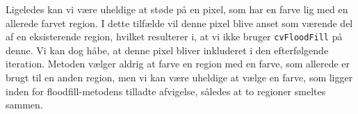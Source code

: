 {Ligeledes kan vi være uheldige at støde på en pixel, som har en farve
lig med en allerede farvet region. I dette tilfælde vil denne pixel
blive anset som værende del af en eksisterende region, hvilket
resulterer i, at vi ikke bruger \texttt{cvFloodFill} på denne. Vi kan
dog håbe, at denne pixel bliver inkluderet i den efterfølgende
iteration.  Metoden vælger aldrig at farve en region med en farve, som
allerede er brugt til en anden region, men vi kan være uheldige at vælge
en farve, som ligger inden for floodfill-metodens tilladte afvigelse,
således at to regioner smeltes sammen.

\begin{figure}[h]
    \setlength\fboxsep{0pt}
    \setlength\fboxrule{0.5pt}
    \centering
    \hspace{1em}
    \\
    \hspace{1em}

\end{figure}}
